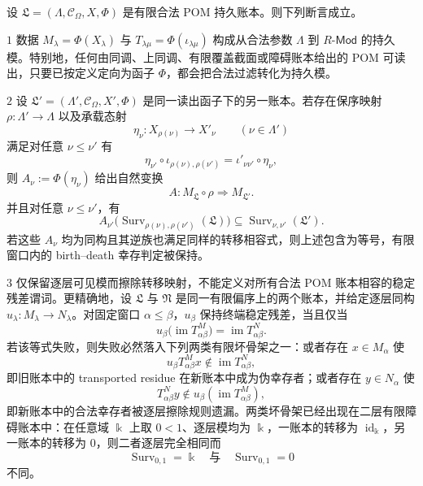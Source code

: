 \begin{theorem}\label{distill:persistent_homology_persistence_modules_and_constructible_sheaf_persistence-functorial_persistence_construction-legal-filtration-refinement-and-transition-erasure}
设 \(\mathfrak L=(\Lambda,\mathcal C_\Omega,X,\Phi)\) 是有限合法 POM 持久账本。则下列断言成立。

\(1\) 数据 \(M_\lambda=\Phi(X_\lambda)\) 与 \(T_{\lambda\mu}=\Phi(\iota_{\lambda\mu})\) 构成从合法参数 \(\Lambda\) 到 \(R\text{-}\mathsf{Mod}\) 的持久模。特别地，任何由同调、上同调、有限覆盖截面或障碍账本给出的 POM 可读出，只要已按定义定向为函子 \(\Phi\)，都会把合法过滤转化为持久模。

\(2\) 设 \(\mathfrak L'=(\Lambda',\mathcal C_\Omega,X',\Phi)\) 是同一读出函子下的另一账本。若存在保序映射 \(\rho:\Lambda'\to\Lambda\) 以及承载态射
\[
   \eta_\nu:X_{\rho(\nu)}\longrightarrow X'_\nu\qquad (\nu\in\Lambda')
\]
满足对任意 \(\nu\leq\nu'\) 有
\[
   \eta_{\nu'}\circ \iota_{\rho(\nu),\rho(\nu')}
   =\iota'_{\nu\nu'}\circ \eta_\nu,
\]
则 \(A_\nu:=\Phi(\eta_\nu)\) 给出自然变换
\[
   A:M_{\mathfrak L}\circ\rho\Longrightarrow M_{\mathfrak L'} .
\]
并且对任意 \(\nu\leq\nu'\)，有
\[
   A_{\nu'}\bigl(\operatorname{Surv}_{\rho(\nu),\rho(\nu')}(\mathfrak L)\bigr)
   \subseteq \operatorname{Surv}_{\nu,\nu'}(\mathfrak L').
\]
若这些 \(A_\nu\) 均为同构且其逆族也满足同样的转移相容式，则上述包含为等号，有限窗口内的 birth--death 幸存判定被保持。

\(3\) 仅保留逐层可见模而擦除转移映射，不能定义对所有合法 POM 账本相容的稳定残差谓词。更精确地，设 \(\mathfrak L\) 与 \(\mathfrak N\) 是同一有限偏序上的两个账本，并给定逐层同构 \(u_\lambda:M_\lambda\to N_\lambda\)。对固定窗口 \(\alpha\leq\beta\)，\(u_\beta\) 保持终端稳定残差，当且仅当
\[
   u_\beta\bigl(\operatorname{im}T^M_{\alpha\beta}\bigr)
   =\operatorname{im}T^N_{\alpha\beta} .
\]
若该等式失败，则失败必然落入下列两类有限坏骨架之一：或者存在 \(x\in M_\alpha\) 使
\[
   u_\beta T^M_{\alpha\beta}x\notin \operatorname{im}T^N_{\alpha\beta},
\]
即旧账本中的 transported residue 在新账本中成为伪幸存者；或者存在 \(y\in N_\alpha\) 使
\[
   T^N_{\alpha\beta}y\notin u_\beta(\operatorname{im}T^M_{\alpha\beta}),
\]
即新账本中的合法幸存者被逐层擦除规则遗漏。两类坏骨架已经出现在二层有限障碍账本中：在任意域 \(\Bbbk\) 上取 \(0<1\)、逐层模均为 \(\Bbbk\)，一账本的转移为 \(\operatorname{id}_{\Bbbk}\)，另一账本的转移为 \(0\)，则二者逐层完全相同而
\[
   \operatorname{Surv}_{0,1}=\Bbbk\quad\text{与}\quad \operatorname{Surv}_{0,1}=0
\]
不同。
\end{theorem}
